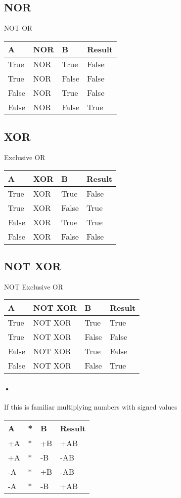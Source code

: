 \documentclass[11pt]{article}
\begin{document}
\subsection{NOR}
NOT OR

\begin{tabular}{lll|l}
A & NOR & B & Result \\
\hline
True & NOR & True & False \\
True & NOR & False & False \\
False & NOR & True & False \\
False & NOR & False & True \\
\hline
\end{tabular}


\subsection{XOR}
Exclusive OR

\begin{tabular}{lll|l}
A & XOR & B & Result \\
\hline
True & XOR & True & False \\
True & XOR & False & True \\
False & XOR & True & True \\
False & XOR & False & False \\
\hline
\end{tabular}


\subsection{NOT XOR}
NOT Exclusive OR

\begin{tabular}{lll|l}
A & NOT XOR & B & Result \\
\hline
True & NOT XOR & True & True \\
True & NOT XOR & False & False \\
False & NOT XOR & True & False \\
False & NOT XOR & False & True \\
\hline
\end{tabular}

\paragraph{•}
If this is familiar multiplying numbers with signed values 


\begin{tabular}{lll|l}
A & * & B & Result \\
\hline
+A & * & +B & +AB \\
+A & * & -B & -AB \\
-A & * & +B & -AB \\
-A & * & -B & +AB \\
\hline
\end{tabular}
\end{document}
